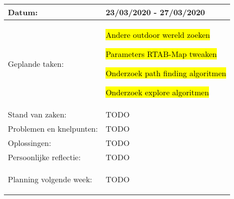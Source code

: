 \begin{tabularx}{\textwidth}{| l | X |}
  \hline
  Datum: & 23/03/2020 - 27/03/2020\\
  \hline
  Geplande taken: &
  \begin{compactitem}
    \item \hl{Andere outdoor wereld zoeken}
    \item \hl{Parameters RTAB-Map tweaken}
    \item \hl{Onderzoek path finding algoritmen}
    \item \hl{Onderzoek explore algoritmen}
  \end{compactitem}\\
  \hline
  Stand van zaken: & TODO\\
  \hline
  Problemen en knelpunten: & TODO\\
  \hline
  Oplossingen: & TODO\\
  \hline
  Persoonlijke reflectie: & TODO\\
  \hline
  Planning volgende week: & 
  \begin{compactitem}
    \item TODO
  \end{compactitem}\\
  \hline
\end{tabularx}